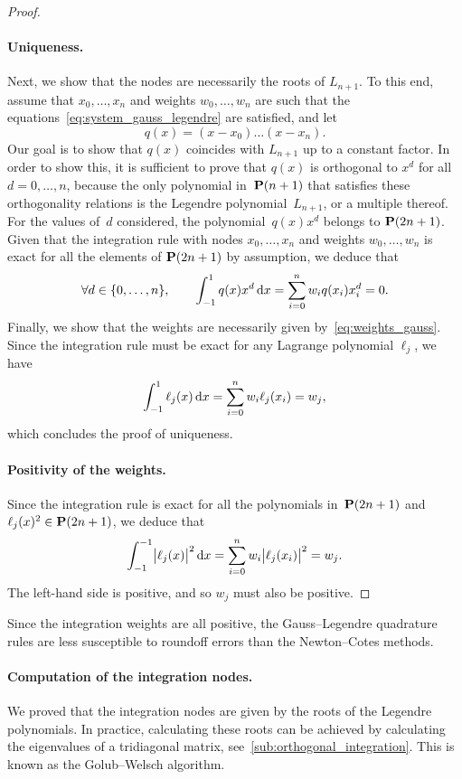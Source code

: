 \begin{proof}
    \paragraph{Uniqueness.}
    Next,
    we show that the nodes are necessarily the roots of $L_{n+1}$.
    To this end,
    assume that $x_0, \dotsc, x_n$ and weights $w_0, \dotsc, w_n$ are such that the equations~\eqref{eq:system_gauss_legendre} are satisfied,
    and let
    \[
        q(x) = (x - x_0) \dotsc (x - x_n).
    \]
    Our goal is to show that $q(x)$ coincides with $L_{n+1}$ up to a constant factor.
    In order to show this,
    it is sufficient to prove that $q(x)$ is orthogonal to $x^d$ for all $d = 0, \dotsc, n$,
    because the only polynomial in~$\mathbf P(n+1)$ that satisfies these orthogonality relations is the Legendre polynomial~$L_{n+1}$,
    or a multiple thereof.
    For the values of~$d$ considered, the polynomial~$q(x) x^d$ belongs to $\mathbf P(2n+1)$.
    Given that the integration rule with nodes $x_0, \dotsc, x_n$ and weights $w_0,\dotsc, w_n$ is exact for all the elements of $\mathbf P(2n+1)$ by assumption,
    we deduce that
    \[
        \forall d \in \{0, \dotsc, n\},
        \qquad \int_{-1}^{1} q(x) x^d \, \mathrm d x = \sum_{i=0}^{n} w_i q(x_i) x_i^d = 0.
    \]
    Finally, we show that the weights are necessarily given by~\eqref{eq:weights_gauss}.
    Since the integration rule must be exact for any Lagrange polynomial $\ell_j$,
    we have
    \[
        \int_{-1}^{1} \ell_j(x) \, \mathrm d x = \sum_{i=0}^{n} w_i \ell_j(x_i) = w_j,
    \]
    which concludes the proof of uniqueness.
    \paragraph{Positivity of the weights.}
    Since the integration rule is exact for all the polynomials in~$\mathbf P(2n+1)$ and $\ell_j(x)^2 \in \mathbf P(2n+1)$,
    we deduce that
    \[
        \int_{-1}^{-1} \bigl\lvert \ell_j(x) \bigr\rvert^2 \, \mathrm d x
        = \sum_{i=0}^{n} w_i \bigl\lvert \ell_j(x_i) \bigr\rvert^2 = w_j.
    \]
    The left-hand side is positive,
    and so $w_j$ must also be positive.
\end{proof}

Since the integration weights are all positive,
the Gauss--Legendre quadrature rules are less susceptible to roundoff errors than the Newton--Cotes methods.

\paragraph{Computation of the integration nodes.}
We proved that the integration nodes are given by the roots of the Legendre polynomials.
In practice, calculating these roots can be achieved by calculating the eigenvalues of a tridiagonal matrix, see~\cref{sub:orthogonal_integration}.
This is known as the Golub--Welsch algorithm.

